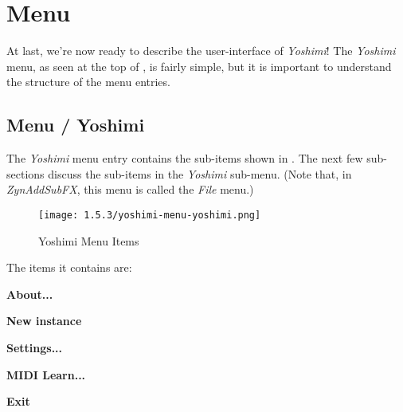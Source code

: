 %
%
%

\section{Menu}
\label{sec:menu}

   At last, we're now ready to describe the user-interface of \textsl{Yoshimi}!
   The \textsl{Yoshimi} menu, as seen at the top of
   ,
   is fairly simple, but it is important to understand the
   structure of the menu entries.

\subsection{Menu / Yoshimi}
\label{subsec:menu_yoshimi}

   The \textsl{Yoshimi}
   menu entry contains the sub-items shown in
   .
   The next few sub-sections discuss the sub-items in the 
   \textsl{Yoshimi} sub-menu.
   (Note that, in \textsl{ZynAddSubFX}, this menu is called the
   \textsl{File} menu.)

\begin{figure}[H]
   \centering 
   \texttt{[image: 1.5.3/yoshimi-menu-yoshimi.png]}
   \caption{Yoshimi Menu Items}
   \label{fig:yoshimi_menu_items}
\end{figure}

   The items it contains are:

   \begin{enumber}
      \item \textbf{About...}
      \item \textbf{New instance}
      \item \textbf{Settings...}
      \item \textbf{MIDI Learn...}
      \item \textbf{Exit}
   \end{enumber}

